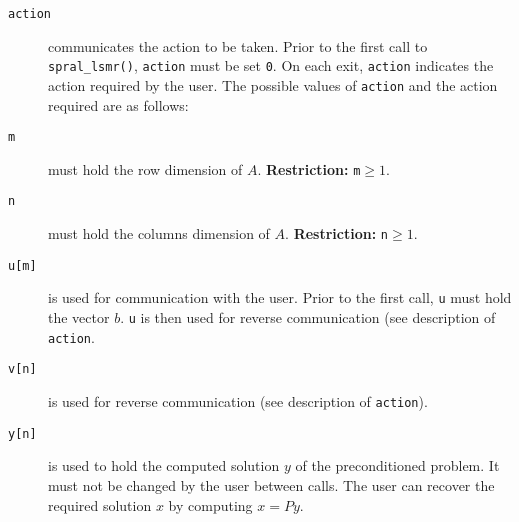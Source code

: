 \noindent
\begin{description}

\item[\texttt{action}] communicates the action to be taken.
Prior to the first call to {\tt spral\_lsmr()},
{\tt action} must be set {\tt 0}. On each exit, {\tt action}
indicates the action required by the user. The possible values of {\tt action}
and the action required are as follows:

\item[\texttt{m}] must hold 
the row dimension of $A$. {\bf Restriction:} {\tt m}$ \ge 1$.

\item[\texttt{n}] must hold 
the columns dimension of $A$.  {\bf Restriction:} {\tt n}$ \ge 1$.

\item[\texttt{u[m]}] is used for communication with the user. Prior to the first call, {\tt u} must hold the vector $b$.
{\tt u} is then used for reverse communication (see description of \texttt{action}.

\item[\texttt{v[n]}] is used for reverse communication (see description of \texttt{action}).


\item[\texttt{y[n]}] is used to hold the computed solution $y$ of the
preconditioned problem. It must not be changed by the user between calls.
The user can recover the required solution $x$ by computing $x = Py$.


\end{description}

